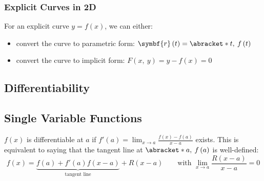 \documentclass{article}
\begin{document}
\subsubsection{Explicit Curves in 2D}
For an explicit curve \(y = f\left( x \right)\), we can either:
\begin{itemize}
    \item convert the curve to parametric form: \(\symbf{r}\left( t
          \right) = \abracket*{t,\: f\left( t \right)}\)
    \item convert the curve to implicit form: \(F\left( x,\: y \right)
          = y - f\left( x \right) = 0\)
\end{itemize}
\subsection{Differentiability}
\subsection{Single Variable Functions}
\(f\left( x \right)\) is differentiable at \(a\) if \(f'\left( a \right) = \lim_{x \to a} \frac{f\left( x \right) - f\left( a \right)}{x - a}\) exists.
This is equivalent to saying that the tangent line at \(\abracket*{a,\: f\left( a \right)}\) is well-defined:
\begin{equation*}
    f\left( x \right) = \underbrace{f\left( a \right) + f'\left( a \right) f\left( x - a \right)}_{\text{tangent line}} + R\left( x - a \right) \qquad \text{with } \lim_{x \to a} \frac{R\left( x - a \right)}{x - a} = 0
\end{equation*}
\end{document}

